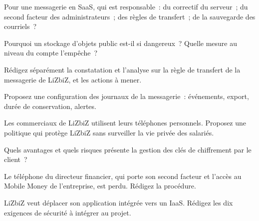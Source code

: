 \begin{boxexo}[title={\ding{45}\quad Exercice~20.2. Qui est responsable~? \niveaubase}]
Pour une messagerie en SaaS, qui est responsable~: du correctif du serveur~;
du second facteur des administrateurs~; des règles de transfert~; de la
sauvegarde des courriels~?
\end{boxexo}

\begin{boxexo}[title={\ding{45}\quad Exercice~20.3. Le stockage public \niveaubase}]
Pourquoi un stockage d'objets public est-il si dangereux~? Quelle mesure
au niveau du compte l'empêche~?
\end{boxexo}

\begin{boxexo}[title={\ding{45}\quad Exercice~20.4. La règle de transfert \niveaumoyen}]
Rédigez séparément la constatation et l'analyse sur la règle de transfert
de la messagerie de LiZbiZ, et les actions à mener.
\end{boxexo}

\begin{boxexo}[title={\ding{45}\quad Exercice~20.5. Les journaux \niveaumoyen}]
Proposez une configuration des journaux de la messagerie~: événements,
export, durée de conservation, alertes.
\end{boxexo}

\begin{boxexo}[title={\ding{45}\quad Exercice~20.6. BYOD \niveaumoyen}]
Les commerciaux de LiZbiZ utilisent leurs téléphones personnels.
Proposez une politique qui protège LiZbiZ sans surveiller la vie privée
des salariés.
\end{boxexo}

\begin{boxexo}[title={\ding{45}\quad Exercice~20.7. Clés \niveaumoyen}]
Quels avantages et quels risques présente la gestion des clés de
chiffrement par le client~?
\end{boxexo}

\begin{boxexo}[title={\ding{45}\quad Exercice~20.8. Un téléphone perdu \niveaumoyen}]
Le téléphone du directeur financier, qui porte son second facteur et
l'accès au Mobile Money de l'entreprise, est perdu. Rédigez la procédure.
\end{boxexo}

\begin{boxexo}[title={\ding{45}\quad Exercice~20.9. Migrer \niveauexpert}]
LiZbiZ veut déplacer son application intégrée vers un IaaS. Rédigez les
dix exigences de sécurité à intégrer au projet.
\end{boxexo}

